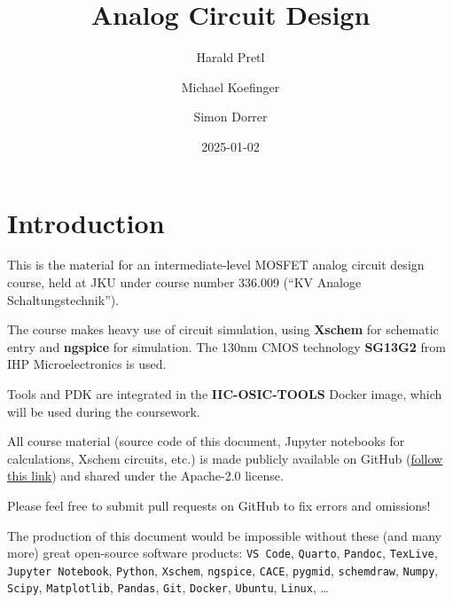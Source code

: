 \documentclass[
  a4paper,
  DIV=11,
  numbers=noendperiod]{scrartcl}
\title{Analog Circuit Design}
\author{Harald Pretl \and Michael Koefinger \and Simon Dorrer}
\date{2025-01-02}
\renewcommand*\contentsname{Table of contents}
\newcommand\contentsname{Table of contents}
\begin{document}
\maketitle

\renewcommand*\contentsname{Table of contents}
{
\hypersetup{linkcolor=}
\setcounter{tocdepth}{3}
\tableofcontents
}

\section{Introduction}\label{sec-intro}

This is the material for an intermediate-level MOSFET analog circuit
design course, held at JKU under course number 336.009 (``KV Analoge
Schaltungstechnik'').

The course makes heavy use of circuit simulation, using \textbf{Xschem}
for schematic entry and \textbf{ngspice} for simulation. The 130nm CMOS
technology \textbf{SG13G2} from IHP Microelectronics is used.

Tools and PDK are integrated in the \textbf{IIC-OSIC-TOOLS} Docker
image, which will be used during the coursework.

\begin{tcolorbox}[enhanced jigsaw, opacityback=0, title=\textcolor{quarto-callout-important-color}{\faExclamation}\hspace{0.5em}{Important}, leftrule=.75mm, bottomtitle=1mm, breakable, bottomrule=.15mm, opacitybacktitle=0.6, colbacktitle=quarto-callout-important-color!10!white, colframe=quarto-callout-important-color-frame, toptitle=1mm, titlerule=0mm, colback=white, rightrule=.15mm, coltitle=black, toprule=.15mm, left=2mm, arc=.35mm]

All course material (source code of this document, Jupyter notebooks for
calculations, Xschem circuits, etc.) is made publicly available on
GitHub (\href{https://github.com/iic-jku/analog-circuit-design}{follow
this link}) and shared under the Apache-2.0 license.

Please feel free to submit pull requests on GitHub to fix errors and
omissions!

The production of this document would be impossible without these (and
many more) great open-source software products: \texttt{VS\ Code},
\texttt{Quarto}, \texttt{Pandoc}, \texttt{TexLive},
\texttt{Jupyter\ Notebook}, \texttt{Python}, \texttt{Xschem},
\texttt{ngspice}, \texttt{CACE}, \texttt{pygmid}, \texttt{schemdraw},
\texttt{Numpy}, \texttt{Scipy}, \texttt{Matplotlib}, \texttt{Pandas},
\texttt{Git}, \texttt{Docker}, \texttt{Ubuntu}, \texttt{Linux}, \ldots{}

\end{tcolorbox}
\end{document}
